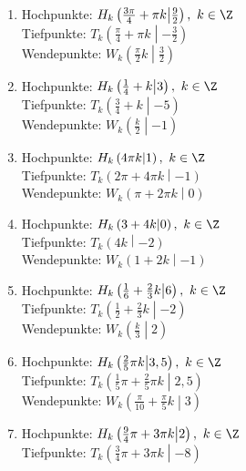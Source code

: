 \begin{Answer}[ref=sincosExtremWendeA1]
	
	\begin{enumerate}[label=\alph*)]
		\item Hochpunkte: \(H_k\left(\frac{3\pi}{4}+\pi k \middle\vert\frac{9}{2} \right),\ k\in\Z\)\\
		Tiefpunkte: \(T_k\left(\frac{\pi}{4}+\pi k \middle\vert-\frac{3}{2} \right)\)\\
		Wendepunkte: \(W_k\left(\frac{\pi}{2}k \middle\vert\frac{3}{2} \right)\)
		\item Hochpunkte: \(H_k\left(\frac{1}{4}+k \middle\vert 3 \right),\ k\in\Z\)\\
		Tiefpunkte: \(T_k\left(\frac{3}{4}+k \middle\vert -5 \right)\)\\
		Wendepunkte: \(W_k\left(\frac{k}{2} \middle\vert-1 \right)\)
		\item Hochpunkte: \(H_k\left(4\pi k \middle\vert1 \right),\ k\in\Z\)\\
		Tiefpunkte: \(T_k\left(2\pi+4\pi k \middle\vert-1 \right)\)\\
		Wendepunkte: \(W_k\left(\pi+2\pi k \middle\vert0 \right)\)
		\item Hochpunkte: \(H_k\left(3+4k \middle\vert 0\right),\ k\in\Z\)\\
		Tiefpunkte: \(T_k\left(4k \middle\vert-2 \right)\)\\
		Wendepunkte: \(W_k\left(1+2k \middle\vert-1 \right)\)
		\item Hochpunkte: \(H_k\left(\frac{1}{6}+\frac{2}{3}k \middle\vert6 \right),\ k\in\Z\)\\
		Tiefpunkte: \(T_k\left(\frac{1}{2}+\frac{2}{3}k \middle\vert-2 \right)\)\\
		Wendepunkte: \(W_k\left(\frac{k}{3} \middle\vert2 \right)\)
		\item Hochpunkte: \(H_k\left(\frac{2}{5}\pi k \middle\vert3,5 \right),\ k\in\Z\)\\
		Tiefpunkte: \(T_k\left(\frac{1}{5}\pi+\frac{2}{5}\pi k \middle\vert2,5 \right)\)\\
		Wendepunkte: \(W_k\left(\frac{\pi}{10}+\frac{\pi}{5}k \middle\vert3 \right)\)
		\item Hochpunkte: \(H_k\left(\frac{9}{4}\pi+3\pi k \middle\vert 2\right),\ k\in\Z\)\\
		Tiefpunkte: \(T_k\left(\frac{3}{4}\pi+3\pi k \middle\vert -8\right)\)\\

\end{enumerate}
\end{Answer}

